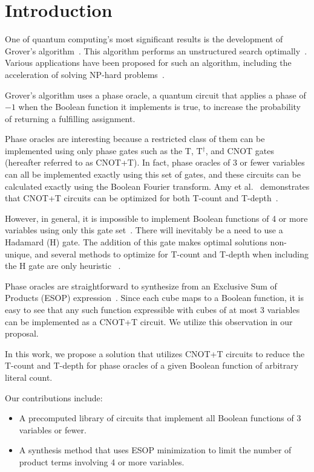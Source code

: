 \section{Introduction}
One of quantum computing's most significant results is the development of Grover's
algorithm~\cite{bib-grover1996fast}. This algorithm performs an unstructured search
optimally~\cite{bib-zaika-grov-opt}. Various applications have
been proposed for such an algorithm, including the acceleration of solving NP-hard
problems~\cite{bib-williams-grover-np}.

Grover's algorithm uses a phase oracle, a quantum circuit that applies a phase of
$-1$ when the Boolean function it implements is true, to increase the probability
of returning a fulfilling assignment.

Phase oracles are interesting because a restricted class of them can be implemented
using only phase gates such as the T, T$^\dagger$, and CNOT gates (hereafter
referred to as CNOT+T). In fact, phase oracles of 3 or fewer variables can all be
implemented exactly using this set of gates, and these circuits can be calculated
exactly using the Boolean Fourier transform. Amy et al.~\cite{amy-meet-in-middle}
demonstrates that CNOT+T circuits can be optimized for both T-count and
T-depth~\cite{bib-amy-matroid}.

However, in general, it is impossible to implement Boolean functions of 4 or more
variables using only this gate set~\cite{bib-amy-rm}. There will inevitably be a need to use
a Hadamard (H) gate. The addition of this gate makes optimal solutions non-unique,
and several methods to optimize for T-count and T-depth when including the H gate
are only heuristic ~\cite{amy-meet-in-middle,bib-amy-matroid,bib-amy-rm}.

Phase oracles are straightforward to synthesize from an Exclusive Sum
of Products (ESOP) expression~\cite{bib-phaseoracle}. Since each cube maps to
a Boolean function, it is easy to see that any such function expressible with
cubes of at most 3 variables can be implemented as a CNOT+T circuit. We utilize
this observation in our proposal.

In this work, we propose a solution that utilizes CNOT+T circuits to reduce the
T-count and T-depth for phase oracles of a given Boolean function of arbitrary
literal count.

Our contributions include:

\begin{itemize}
\item A precomputed library of circuits that implement all Boolean functions of
  3 variables or fewer.
\item A synthesis method that uses ESOP minimization to limit the number of
  product terms involving 4 or more variables.
\end{itemize}

